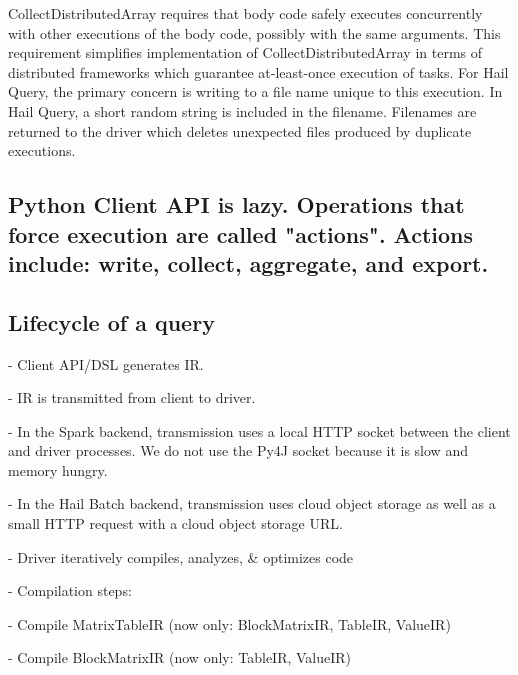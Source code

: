 \documentclass[10pt,a4paper%
]{article}
\begin{document}




CollectDistributedArray requires that body code safely executes concurrently with other executions
of the body code, possibly with the same arguments. This requirement simplifies implementation of
CollectDistributedArray in terms of distributed frameworks which guarantee at-least-once execution
of tasks. For Hail Query, the primary concern is writing to a file name unique to this execution. In
Hail Query, a short random string is included in the filename. Filenames are returned to the driver
which deletes unexpected files produced by duplicate executions.

\subsection{Python Client API is lazy. Operations that force execution are called "actions". Actions include: write, collect, aggregate, and export.}

\subsection{Lifecycle of a query}

    - Client API/DSL generates IR.

    - IR is transmitted from client to driver.

      - In the Spark backend, transmission uses a local HTTP socket between the client and driver processes. We do not use the Py4J socket because it is slow and memory hungry.

      - In the Hail Batch backend, transmission uses cloud object storage as well as a small HTTP request with a cloud object storage URL.

    - Driver iteratively compiles, analyzes, \& optimizes code

      - Compilation steps:

        - Compile MatrixTableIR (now only: BlockMatrixIR, TableIR, ValueIR)

        - Compile BlockMatrixIR (now only: TableIR, ValueIR)
\end{document}
